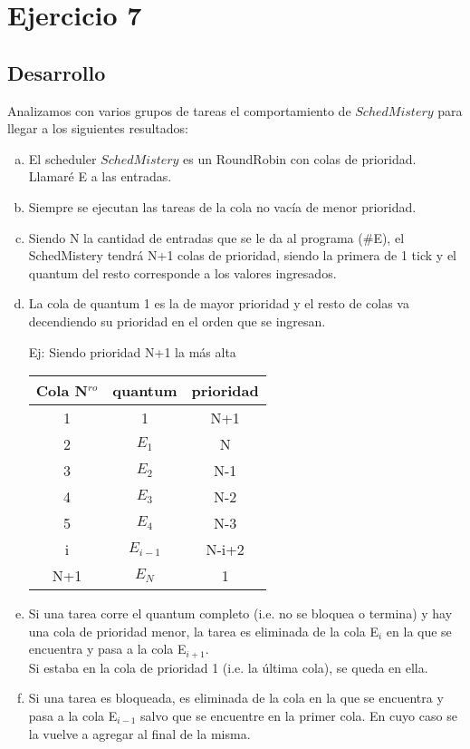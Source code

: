 \section{Ejercicio 7}
\subsection{Desarrollo}
Analizamos con varios grupos de tareas el comportamiento de $SchedMistery$ para llegar a los siguientes resultados:

\begin{enumerate}[(a)]

\item El scheduler $SchedMistery$ es un RoundRobin con colas de prioridad. Llamar\'e E a las entradas.

\item Siempre se ejecutan las tareas de la cola no vac\'ia de menor prioridad.

\item Siendo N la cantidad de entradas que se le da al programa (\#E), el SchedMistery tendr\'a N+1 colas de prioridad, siendo la primera de 1 tick y el quantum del resto corresponde a los valores ingresados.

\item La cola de quantum 1 es la de mayor prioridad y el resto de colas va decendiendo su prioridad en el orden que se ingresan.

Ej: Siendo prioridad N+1 la m\'as alta
\begin{table}[H]
\centering
\begin{tabular}{ | c | c | c |}
  \hline			
  Cola N$^{ro}$ & quantum & prioridad\\
  \hline
1 	& 1 			& N+1\\
2 	& $E_1$ 		& N\\
3 	& $E_2$ 		& N-1\\
4 	& $E_3$ 		& N-2\\
5 	& $E_4$ 		& N-3\\
  \hline
i 	& $E_{i-1}$ 	& N-i+2\\
  \hline
N+1 & $E_N$ 		& 1\\
  \hline

\end{tabular}
\end{table}

\item Si una tarea corre el quantum completo (i.e. no se bloquea o termina) y hay una cola de prioridad menor, la tarea es eliminada de la cola E$_i$ en la que se encuentra y pasa a la cola E$_{i+1}$.\\
	Si estaba en la cola de prioridad 1 (i.e. la \'ultima cola), se queda en ella.
	
\item Si una tarea es bloqueada, es eliminada de la cola en la que se encuentra y pasa a la cola E$_{i-1}$ salvo que se encuentre en la primer cola. En cuyo caso se la vuelve a agregar al final de la misma.

\end{enumerate}

